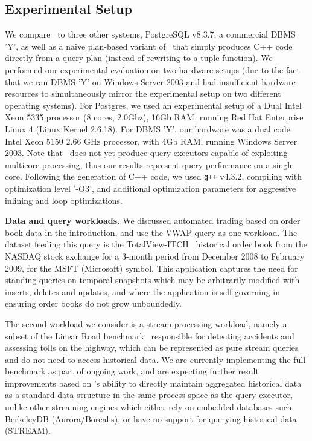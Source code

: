 \subsection{Experimental Setup}
We compare \compiler\ to three other systems, PostgreSQL v8.3.7, a commercial
DBMS 'Y', as well as a naive plan-based variant of \compiler\ that simply
produces C++ code directly from a query plan (instead of rewriting to a tuple
function). We performed our experimental evaluation on two hardware setups (due
to the fact that we ran DBMS 'Y' on Windows Server 2003 and had insufficient
hardware resources to simultaneously mirror the experimental setup on two
different operating systems). For Postgres, we used an experimental setup of a
Dual Intel Xeon 5335 processor (8 cores, 2.0Ghz), 16Gb RAM, running Red Hat
Enterprise Linux 4 (Linux Kernel 2.6.18). For DBMS 'Y', our hardware was a dual
code Intel Xeon 5150 2.66 GHz processor, with 4Gb RAM, running Windows Server
2003. Note that \compiler\ does not yet produce query executors capable of
exploiting multicore processing, thus our results represent query performance on
a single core. Following the generation of C++ code, we used \texttt{g++} v4.3.2,
compiling with optimization level '-O3', and additional optimization parameters
for aggressive inlining and loop optimizations.

\textbf{Data and query workloads.}
We discussed automated trading based on order book data in the introduction, and
use the VWAP query as one workload. The dataset feeding this query is the
TotalView-ITCH~\cite{totalview-url} historical order book from the NASDAQ stock
exchange for a 3-month period from December 2008 to February 2009, for the MSFT
(Microsoft) symbol. This application captures the need for standing queries on
temporal snapshots which may be arbitrarily modified with inserts, deletes and
updates, and where the application is self-governing in ensuring order books do
not grow unboundedly.

The second workload we consider is a stream processing workload, namely a subset
of the Linear Road benchmark~\cite{arasu-vldb:04} responsible for detecting
accidents and assessing tolls on the highway, which can be represented as pure
stream queries and do not need to access historical data. We are currently
implementing the full benchmark as part of ongoing work, and are expecting
further result improvements based on \compiler's ability to directly maintain
aggregated historical data as a standard data structure in the same process space
as the query executor, unlike other streaming engines which either rely on
embedded databases such BerkeleyDB (Aurora/Borealis), or have no support for
querying historical data (STREAM).

